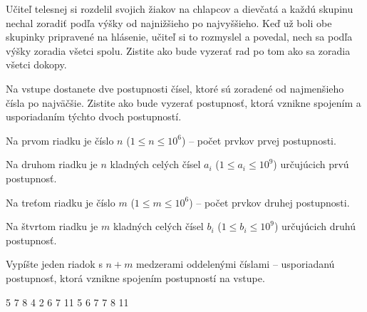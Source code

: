 




Učiteľ telesnej si rozdelil svojich žiakov na chlapcov a dievčatá a každú skupinu nechal zoradiť
podľa výšky od najnižšieho po najvyššieho. Keď už boli obe skupinky pripravené na hlásenie, učiteľ
si to rozmyslel a povedal, nech sa podľa výšky zoradia všetci spolu. Zistite ako bude vyzerať rad po
tom ako sa zoradia všetci dokopy.


Na vstupe dostanete dve postupnosti čísel, ktoré sú zoradené od najmenšieho čísla po najväčšie.
Zistite ako bude vyzerať postupnosť, ktorá vznikne spojením a usporiadaním týchto dvoch postupností.


Na prvom riadku je číslo $n$ ($1 \leq n \leq 10^6$) -- počet prvkov prvej postupnosti.

Na druhom riadku je $n$ kladných celých čísel $a_i$ ($1 \leq a_i \leq 10^9$) určujúcich prvú
postupnosť.

Na treťom riadku je číslo $m$ ($1 \leq m \leq 10^6$) -- počet prvkov druhej postupnosti.

Na štvrtom riadku je $m$ kladných celých čísel $b_i$ ($1 \leq b_i \leq 10^9$) určujúcich druhú
postupnosť.


Vypíšte jeden riadok s $n+m$ medzerami oddelenými číslami -- usporiadanú postupnosť, ktorá vznikne
spojením postupností na vstupe.


5 7 8
4
2 6 7 11
 5 6 7 7 8 11
\koniec


